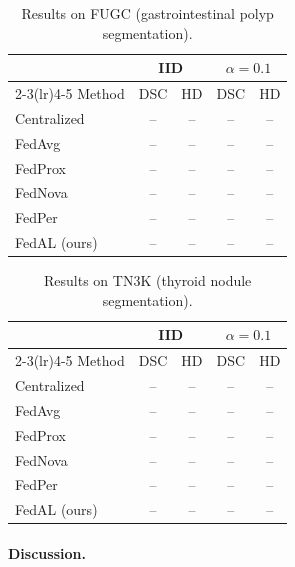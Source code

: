 \begin{table}[t]
\centering
\caption{Results on FUGC (gastrointestinal polyp segmentation).}
\label{tab:fugc}
\begin{tabular}{lcccc}
\toprule
& \multicolumn{2}{c}{IID} & \multicolumn{2}{c}{$\alpha=0.1$} \\
\cmidrule(lr){2-3}\cmidrule(lr){4-5}
Method & DSC & HD & DSC & HD \\
\midrule
Centralized   & --   & --   & --   & -- \\
\midrule
FedAvg        & --   & --   & --   & -- \\
FedProx       & --   & --   & --   & -- \\
FedNova       & --   & --   & --   & -- \\
FedPer        & --   & --   & --   & -- \\
\midrule
FedAL (ours)  & --   & --   & --   & -- \\
\bottomrule
\end{tabular}
\end{table}

\begin{table}[t]
\centering
\caption{Results on TN3K (thyroid nodule segmentation).}
\label{tab:tn3k}
\begin{tabular}{lcccc}
\toprule
& \multicolumn{2}{c}{IID} & \multicolumn{2}{c}{$\alpha=0.1$} \\
\cmidrule(lr){2-3}\cmidrule(lr){4-5}
Method & DSC & HD & DSC & HD \\
\midrule
Centralized   & --   & --   & --   & -- \\
\midrule
FedAvg        & --   & --   & --   & -- \\
FedProx       & --   & --   & --   & -- \\
FedNova       & --   & --   & --   & -- \\
FedPer        & --   & --   & --   & -- \\
\midrule
FedAL (ours)  & --   & --   & --   & -- \\
\bottomrule
\end{tabular}
\end{table}

\paragraph{Discussion.}
